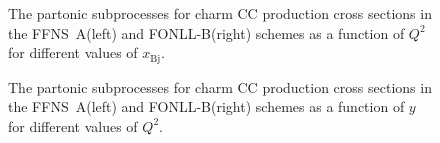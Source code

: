 \documentclass[pdftex,twocolumn,epjc3]{svjour3}          %
\newcommand{\xbj}{\ensuremath{x_{\text{Bj}}}\xspace}
\newcommand{\fonll} {{FONLL-B}\xspace}
\newcommand{\ffns} {{FFNS~A}\xspace}
\begin{document}
\begin{figure}
  \centering
  \caption{The partonic subprocesses for charm CC production cross
    sections in the \ffns (left) and \fonll (right) schemes as a
    function of $Q^2$ for different values of \xbj.}
  \label{fig:partonic-q2}
\end{figure}

\begin{figure}
  \centering
  \caption{The partonic subprocesses for charm CC production cross
    sections in the \ffns (left) and \fonll (right) schemes as a
    function of $y$ for different values of $Q^2$.}
  \label{fig:partonic-y}
\end{figure}
\end{document}
